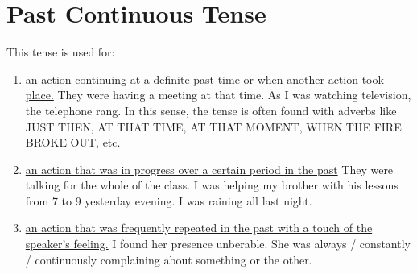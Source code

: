\section{Past Continuous Tense}
This tense is used for:
\begin{enumerate}
    \item \underline{an action continuing at a definite past time or when
        another action took place.}
        \newline
        They were having a meeting at that time.
        As I was watching television, the telephone rang.
        \newline
        In this sense, the tense is often found with adverbs like JUST THEN, AT
        THAT TIME, AT THAT MOMENT, WHEN THE FIRE BROKE OUT, etc.
    \item \underline{an action that was in progress over a certain period in the
        past}
        \newline
        They were talking for the whole of the class.
        \newline
        I was helping my brother with his lessons from 7 to 9 yesterday evening.
        \newline
        I was raining all last night.
    \item \underline{an action that was frequently repeated in the past with a
        touch of the speaker's feeling.}
        \newline
        I found her presence unberable. She was always / constantly /
        continuously complaining about something or the other.
\end{enumerate}

\newpage
